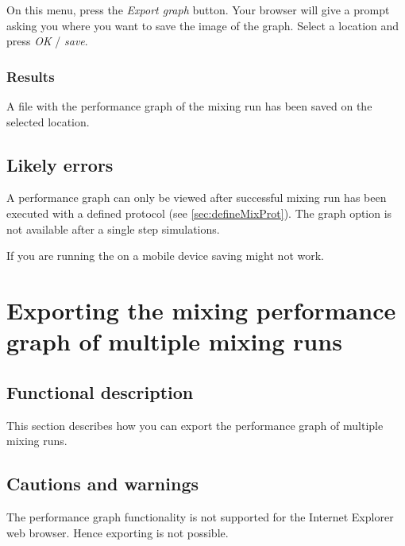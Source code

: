 
On this menu, press the \emph{Export graph} button. Your browser will give a prompt asking you where you want to save the image of the graph. Select a location and press \emph{OK} / \emph{save}.

\subsubsection{Results}
A file with the performance graph of the mixing run has been saved on the selected location.

\subsection{Likely errors}
A performance graph can only be viewed after successful mixing run has been executed with a defined protocol (see \ref{sec:defineMixProt}). The graph option is not available after a single step simulations.

If you are running the \applicationname on a mobile device saving might not work.


\section{Exporting the mixing performance graph of multiple mixing runs}
\label{sec:exportMultiGraph}

\subsection{Functional description}
This section describes how you can export the performance graph of multiple mixing runs.

\subsection{Cautions and warnings}
The performance graph functionality is not supported for the Internet Explorer web browser. Hence exporting is not possible.

